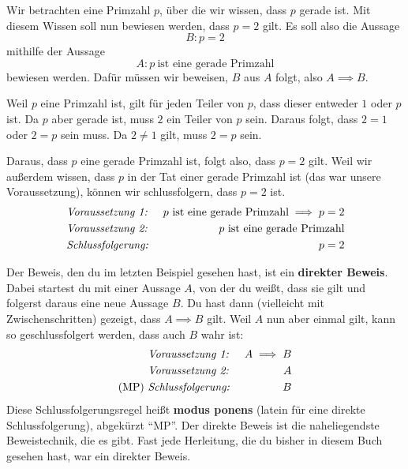 \documentclass[../../main.tex]{subfiles}
\begin{document}
\begin{example}{}
    Wir betrachten eine Primzahl $p$, über die wir wissen, dass $p$ gerade ist. Mit diesem Wissen soll nun bewiesen werden, dass $p=2$ gilt. Es soll also die Aussage
    \[B:p=2\]
    mithilfe der Aussage
    \[A:p~\text{ist~eine~gerade~Primzahl}\]
    bewiesen werden. Dafür müssen wir beweisen, $B$ aus $A$ folgt, also $A\implies B$.

    Weil $p$ eine Primzahl ist, gilt für jeden Teiler von $p$, dass dieser entweder $1$ oder $p$ ist. Da $p$ aber gerade ist, muss $2$ ein Teiler von $p$ sein. Daraus folgt, dass $2=1$ oder $2=p$ sein muss. Da $2\neq 1$ gilt, muss $2=p$ sein.

    Daraus, dass $p$ eine gerade Primzahl ist, folgt also, dass $p=2$ gilt. Weil wir außerdem wissen, dass $p$ in der Tat einer gerade Primzahl ist (das war unsere Voraussetzung), können wir schlussfolgern, dass $p=2$ ist.
    \begin{align*}
        &\text{\emph{Voraussetzung~1:}}~&p~\text{ist~eine~gerade~Primzahl} \implies p=2\\
        &\text{\emph{Voraussetzung~2:}}~&p~\text{ist~eine~gerade~Primzahl}\\
        &\text{\emph{Schlussfolgerung:}}~&p=2
    \end{align*}
\end{example}

Der Beweis, den du im letzten Beispiel gesehen hast, ist ein \textbf{direkter Beweis}. Dabei startest du mit einer Aussage $A$, von der du weißt, dass sie gilt und folgerst daraus eine neue Aussage $B$. Du hast dann (vielleicht mit Zwischenschritten) gezeigt, dass $A \implies B$ gilt. Weil $A$ nun aber einmal gilt, kann so geschlussfolgert werden, dass auch $B$ wahr ist:
\begin{align*}
    &\text{\emph{Voraussetzung~1:}}~&A \implies B\\
    &\text{\emph{Voraussetzung~2:}}~&A\\
    (\text{MP})~&\text{\emph{Schlussfolgerung:}}~&B
\end{align*}
Diese Schlussfolgerungsregel heißt \textbf{modus ponens} (latein für eine direkte Schlussfolgerung), abgekürzt \enquote{MP}. Der direkte Beweis ist die naheliegendste Beweistechnik, die es gibt. Fast jede Herleitung, die du bisher in diesem Buch gesehen hast, war ein direkter Beweis.
\end{document}
